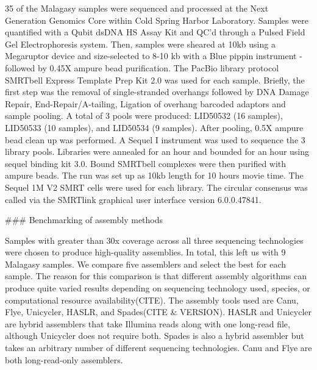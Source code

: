 \begin{markdown}
35 of the Malagasy samples were sequenced and processed at the Next Generation Genomics Core within Cold Spring Harbor Laboratory. Samples were quantified with a Qubit dsDNA HS Assay Kit and QC’d through a Pulsed Field Gel Electrophoresis system. Then, samples were sheared at 10kb using a Megaruptor device and size-selected to 8-10 kb with a Blue pippin instrument - followed by 0.45X ampure bead purification. The PacBio library protocol SMRTbell Express Template Prep Kit 2.0 was used for each sample. Briefly, the first step was the removal of single-stranded overhangs followed by DNA Damage Repair, End-Repair/A-tailing, Ligation of overhang barcoded adaptors and sample pooling. A total of 3 pools were produced: LID50532 (16 samples), LID50533 (10 samples), and LID50534 (9 samples). After pooling, 0.5X ampure bead clean up was performed. A Sequel I instrument was used to sequence the 3 library pools. Libraries were annealed for an hour and bounded for an hour using sequel binding kit 3.0. Bound SMRTbell complexes were then purified with ampure beads. The run was set up as 10kb length for 10 hours movie time. The Sequel 1M V2 SMRT cells were used for each library.  
The circular consensus was called via the SMRTlink graphical user interface version 6.0.0.47841.


### Benchmarking of assembly methods 

Samples with greater than 30x coverage across all three sequencing technologies were chosen to produce high-quality assemblies. In total, this left us with 9 Malagasy samples. We compare five assemblers and select the best for each sample. The reason for this comparison is that different assembly algorithms can produce quite varied results depending on sequencing technology used, species, or computational resource availability(CITE).  
The assembly tools used are Canu, Flye, Unicycler, HASLR, and Spades(CITE \& VERSION). HASLR and Unicycler are hybrid assemblers that take Illumina reads along with one long-read file, although Unicycler does not require both. Spades is also a hybrid assembler but takes an arbitrary number of different sequencing technologies. Canu and Flye are both long-read-only assemblers.


\end{markdown}
